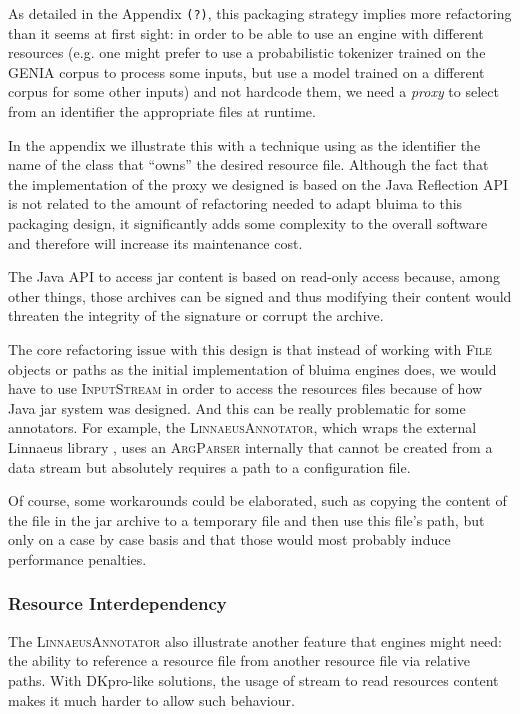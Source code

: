 \documentclass{article}
\newcommand{\ID}[1]{{\textsc{#1}}}
\newcommand{\TODO}[1]{\texttt{\textcolor{YellowOrange}{(#1)}}} %
\begin{document}
As detailed in the Appendix \TODO{?}, this packaging strategy implies more refactoring than it seems
at first sight: in order to be able to use an engine with different resources (e.g. one might prefer
to use a probabilistic tokenizer trained on the GENIA corpus to process some inputs, but use a model
trained on a different corpus for some other inputs) and not hardcode them, we need a \emph{proxy}
to select from an identifier the appropriate files at runtime.

In the appendix we illustrate this with a technique using as the identifier the name of the class
that ``owns'' the desired resource file. Although the fact that the implementation of the proxy we
designed is based on the Java Reflection API is not related to the amount of refactoring needed to
adapt bluima to this packaging design, it significantly adds some complexity to the overall software
and therefore will increase its maintenance cost.

The Java API to access jar content is based on read-only access because, among other things, those
archives can be signed and thus modifying their content would threaten the integrity of the
signature or corrupt the archive.

The core refactoring issue with this design is that instead of working with \ID{File} objects or
paths as the initial implementation of bluima engines does, we would have to use \ID{InputStream} in
order to access the resources files because of how Java jar system was designed. And this can be
really problematic for some annotators. For example, the \ID{LinnaeusAnnotator}, which wraps the
external Linnaeus library \cite{linnaeus}, uses an \ID{ArgParser} internally that cannot be created
from a data stream but absolutely requires a path to a configuration file.

Of course, some workarounds could be elaborated, such as copying the content of the file in the jar
archive to a temporary file and then use this file's path, but only on a case by case basis and that
those would most probably induce performance penalties.

\subsubsection{Resource Interdependency}

The \ID{LinnaeusAnnotator} also illustrate another feature that engines might need: the ability to
reference a resource file from another resource file via relative paths. With DKpro-like solutions,
the usage of stream to read resources content makes it much harder to allow such behaviour.
\end{document}
